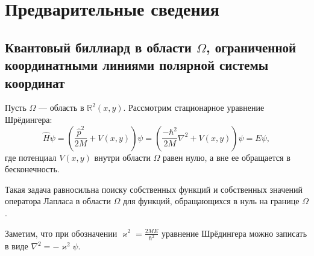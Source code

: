 \chapter{Предварительные сведения}\label{ch:ch1}
\section{Квантовый биллиард в области $\Omega$, ограниченной координатными линиями полярной системы координат}\label{sec:ch1/sec2}

Пусть $\Omega$ --- область в $\mathbb{R}^2(x,y)$. Рассмотрим стационарное уравнение Шрёдингера:
\begin{equation*}
\hat{H}\psi = \left(\frac{\hat{p}^2}{2M} + V(x,y)\right) \psi = \left( \frac{-\hbar^2}{2M}\nabla^2 + V(x, y)\right) \psi = E\psi,
\label{eq:schrodinger}
\end{equation*}
где потенциал $V(x,y)$ внутри области $\Omega$ равен нулю, а вне ее обращается в бесконечность. 

\begin{remark}
Такая задача равносильна поиску собственных функций и собственных значений оператора Лапласа в области $\Omega$ для функций, обращающихся в нуль на границе $\Omega$. 
\label{rem:schrodinger_equivalent}
\end{remark}

Заметим, что при обозначении $\varkappa^2 = \frac{2 M E}{\hbar^2}$ уравнение Шрёдингера можно записать в виде $\nabla^2  = -\varkappa^2 \psi$.

